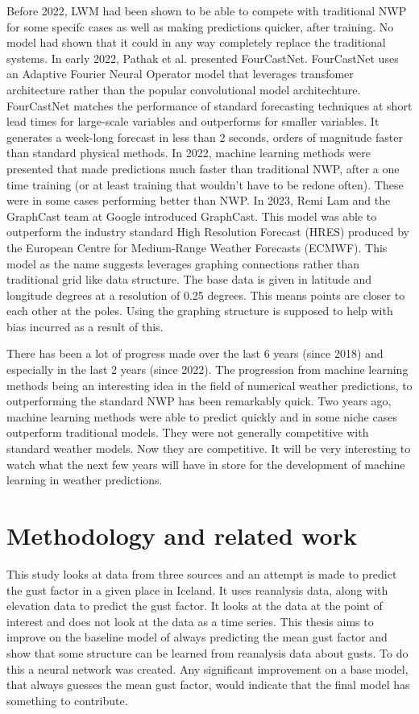 Before 2022, LWM had been shown to be able to compete with traditional NWP for some specifc cases as well as making predictions quicker, after training. No model had shown that it could in any way completely replace the traditional systems. In early 2022, Pathak et al. presented FourCastNet. FourCastNet uses an Adaptive Fourier Neural Operator model that leverages transfomer architecture rather than the popular convolutional model architechture. FourCastNet matches the performance of standard forecasting techniques at short lead times for large-scale variables and outperforms for smaller variables. It generates a week-long forecast in less than 2 seconds, orders of magnitude faster than standard physical methods\cite{FourCastNet}. In 2022, machine learning methods were presented that made predictions much faster than traditional NWP, after a one time training (or at least training that wouldn't have to be redone often). These were in some cases performing better than NWP.  In 2023, Remi Lam and the GraphCast team at Google introduced GraphCast. This model was able to outperform the industry standard High Resolution Forecast (HRES) produced by the European Centre for Medium-Range Weather Forecasts (ECMWF). This model as the name suggests leverages graphing connections rather than traditional grid like data structure. The base data is given in latitude and longitude degrees at a resolution of 0.25 degrees. This means points are closer to each other at the poles. Using the graphing structure is supposed to help with bias incurred as a result of this\cite{GraphCast}.

There has been a lot of progress made over the last 6 years (since 2018) and especially in the last 2 years (since 2022). The progression from machine learning methods being an interesting idea in the field of numerical weather predictions, to outperforming the standard NWP has been remarkably quick. Two years ago, machine learning methods were able to predict quickly and in some niche cases outperform traditional models. They were not generally competitive with standard weather models. Now they are competitive. It will be very interesting to watch what the next few years will have in store for the development of machine learning in weather predictions.

\section{Methodology and related work}

This study looks at data from three sources and an attempt is made to predict the gust factor in a given place in Iceland. It uses reanalysis data, along with elevation data to predict the gust factor. It looks at the data at the point of interest and does not look at the data as a time series. This thesis aims to improve on the baseline model of always predicting the mean gust factor and show that some structure can be learned from reanalysis data about gusts. To do this a neural network was created. Any significant improvement on a base model, that always guesses the mean gust factor, would indicate that the final model has something to contribute.

